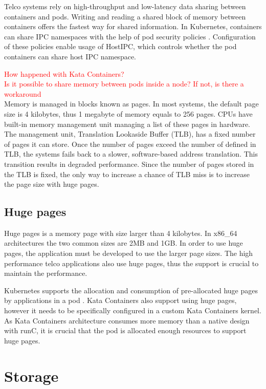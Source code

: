 Telco systems rely on high-throughput and low-latency data sharing between containers and pods. Writing and reading a shared block of memory between containers offers the fastest way for shared information. In Kubernetes, containers can share IPC namespaces with the help of pod security policies \cite{PodSecurityPolicyKubernetes}. Configuration of these policies enable usage of HostIPC, which controls whether the pod containers can share host IPC namespace.

\textcolor{red}{How happened with Kata Containers?} \\
\textcolor{red}{Is it possible to share memory between pods inside a node? If not, is there a workaround} \\

Memory is managed in blocks known as pages. In most systems, the default page size is 4 kilobytes, thus 1 megabyte of memory equals to 256 pages. CPUs have built-in memory management unit managing a list of these pages in hardware. The management unit, Translation Lookaside Buffer (TLB), has a fixed number of pages it can store. Once the number of pages exceed the number of defined in TLB, the systems fails back to a slower, software-based address translation. This transition results in degraded performance. Since the number of pages stored in the TLB is fixed, the only way to increase a chance of TLB miss is to increase the page size with huge pages. \cite{HugePagesOpenShift}

\subsection{Huge pages}

Huge pages is a memory page with size larger than 4 kilobytes. In x86\_64 architectures the two common sizes are 2MB and 1GB. In order to use huge pages, the application must be developed to use the larger page sizes. The high performance telco applications also use huge pages, thus the support is crucial to maintain the performance.

Kubernetes supports the allocation and consumption of pre-allocated huge pages by applications in a pod \cite{HugePagesKubernetes}. Kata Containers also support using huge pages, however it needs to be specifically configured in a custom Kata Containers kernel. As Kata Containers architecture consumes more memory than a native design with runC, it is crucial that the pod is allocated enough resources to support huge pages.

\section{Storage}

